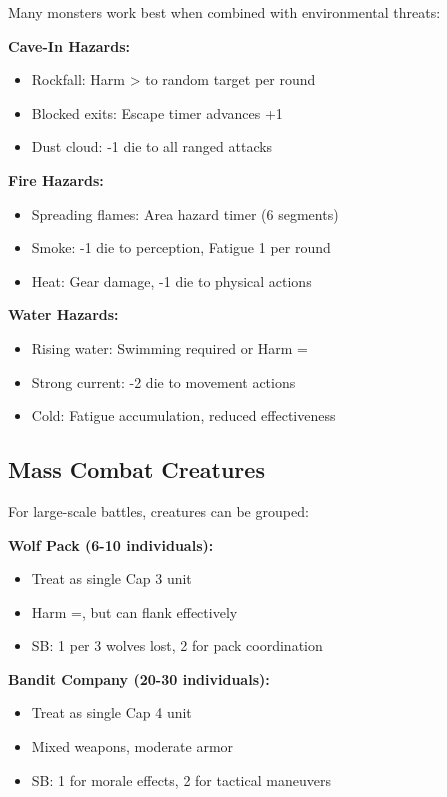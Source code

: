 \documentclass[12pt]{article}
\begin{document}
\begin{itemize}
Many monsters work best when combined with environmental threats:

\textbf{Cave-In Hazards:}
\begin{itemize}
\item Rockfall: Harm > to random target per round
\item Blocked exits: Escape timer advances +1
\item Dust cloud: -1 die to all ranged attacks
\end{itemize}

\textbf{Fire Hazards:}
\begin{itemize}
\item Spreading flames: Area hazard timer (6 segments)
\item Smoke: -1 die to perception, Fatigue 1 per round
\item Heat: Gear damage, -1 die to physical actions
\end{itemize}

\textbf{Water Hazards:}
\begin{itemize}
\item Rising water: Swimming required or Harm =
\item Strong current: -2 die to movement actions
\item Cold: Fatigue accumulation, reduced effectiveness
\end{itemize}

\subsection*{Mass Combat Creatures}

For large-scale battles, creatures can be grouped:

\textbf{Wolf Pack (6-10 individuals):}
\begin{itemize}
\item Treat as single Cap 3 unit
\item Harm =, but can flank effectively
\item SB: 1 per 3 wolves lost, 2 for pack coordination
\end{itemize}

\textbf{Bandit Company (20-30 individuals):}
\begin{itemize}
\item Treat as single Cap 4 unit
\item Mixed weapons, moderate armor
\item SB: 1 for morale effects, 2 for tactical maneuvers
\end{itemize}


\end{itemize}
\end{document}
